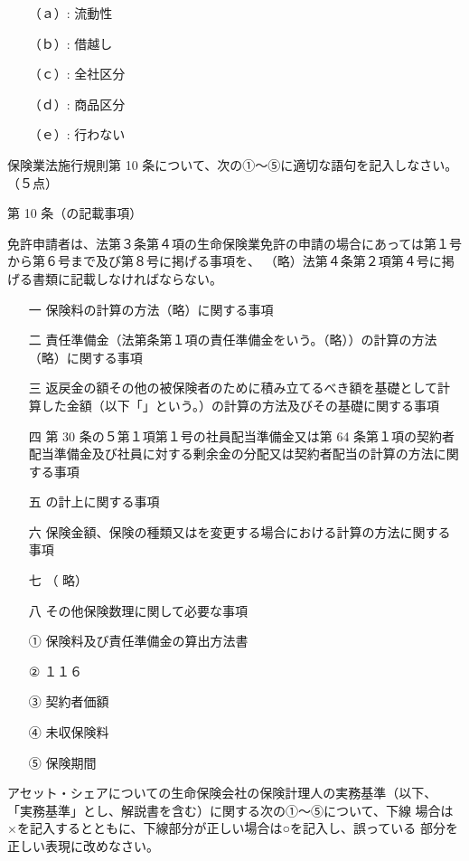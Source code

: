 \documentclass[report,gutter=10mm,fore-edge=10mm,uplatex,dvipdfmx]{jlreq}
\begin{document}
\answer{}
\begin{itemize}
\item[ （ａ）: ]  流動性
\item[ （ｂ）: ]  借越し
\item[ （ｃ）: ]  全社区分
\item[ （ｄ）: ]  商品区分
\item[ （ｅ）: ]  行わない
\end{itemize}

保険業法施行規則第 10 条について、次の①～⑤に適切な語句を記入しなさい。（５点）

第 10 条（の記載事項）

免許申請者は、法第３条第４項の生命保険業免許の申請の場合にあっては第１号から第６号まで及び第８号に掲げる事項を、
（略）法第４条第２項第４号に掲げる書類に記載しなければならない。

\begin{itemize}
\item[ 一  ] 保険料の計算の方法（略）に関する事項
\item[ 二  ] 責任準備金（法第条第１項の責任準備金をいう。（略））の計算の方法（略）に関する事項
\item[ 三  ] 返戻金の額その他の被保険者のために積み立てるべき額を基礎として計算した金額（以下「」という。）の計算の方法及びその基礎に関する事項
\item[ 四  ] 第 30 条の５第１項第１号の社員配当準備金又は第 64 条第１項の契約者配当準備金及び社員に対する剰余金の分配又は契約者配当の計算の方法に関する事項
\item[ 五  ] の計上に関する事項
\item[ 六  ] 保険金額、保険の種類又はを変更する場合における計算の方法に関する事項
\item[ 七  ]（ 略）
\item[ 八  ] その他保険数理に関して必要な事項
\end{itemize}

\answer{}
\begin{itemize}
\item[ ① ] 保険料及び責任準備金の算出方法書 
\item[ ② ] １１６ 
\item[ ③ ] 契約者価額 
\item[ ④ ] 未収保険料
\item[ ⑤ ] 保険期間
\end{itemize}
\answer{}

アセット・シェアについての生命保険会社の保険計理人の実務基準（以下、
「実務基準」とし、解説書を含む）に関する次の①～⑤について、下線
場合は×を記入するとともに、下線部分が正しい場合は○を記入し、誤っている
部分を正しい表現に改めなさい。
\end{document}
